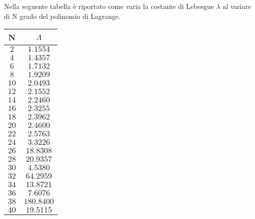 


Nella seguente tabella è riportato come varia la costante di Lebesgue $\lambda$
al variare di N grado del polinomio di Lagrange.
\\
\begin{center}
	\begin{tabular}{|c|c|}
		\hline
			N & $\Lambda$ \\
    \hline
    $2$  & $1.1554$ \\ 
    $4$  & $1.4357$ \\ 
    $6$  & $1.7132$ \\ 
    $8$  & $1.9209$ \\ 
    $10$ & $2.0493$ \\ 
    $12$ & $2.1552$ \\ 
    $14$ & $2.2460$ \\ 
    $16$ & $2.3255$ \\ 
    $18$ & $2.3962$ \\ 
    $20$ & $2.4600$ \\ 
    $22$ & $2.5763$ \\ 
    $24$ & $3.3226$ \\ 
    $26$ & $18.8308$ \\ 
    $28$ & $20.9357$ \\ 
    $30$ & $4.5380$ \\ 
    $32$ & $64.2959$ \\ 
    $34$ & $13.8721$ \\ 
    $36$ & $7.6076$ \\ 
    $38$ & $180.8400$ \\ 
    $40$ & $19.5115$ \\ 
		\hline
	\end{tabular}
\end{center} 
